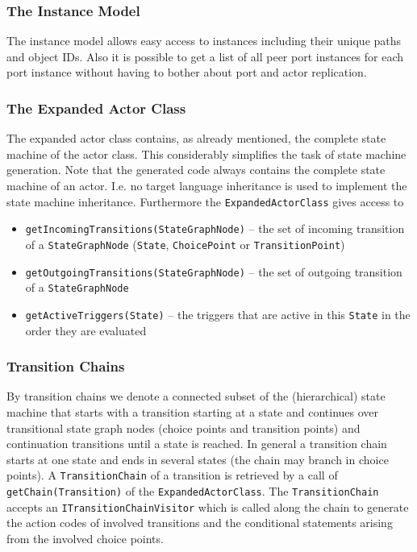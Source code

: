 \subsubsection{The Instance Model}

The instance model allows easy access to instances including their unique paths and object IDs. Also it is possible to get a list of all peer port instances for each port instance without having to bother about port and actor replication.

\subsubsection{The Expanded Actor Class}

The expanded actor class contains, as already mentioned, the complete state machine of the actor class. This considerably simplifies the task of state machine generation. Note that the generated code always contains the complete state machine of an actor. I.e. no target language inheritance is used to implement the state machine inheritance.
Furthermore the \texttt{ExpandedActorClass} gives access to
\begin{itemize}
\item \texttt{getIncomingTransitions(StateGraphNode)} -- the set of incoming transition of a \texttt{StateGraphNode} (\texttt{State}, \texttt{ChoicePoint} or \texttt{TransitionPoint})
\item \texttt{getOutgoingTransitions(StateGraphNode)} -- the set of outgoing transition of a \texttt{StateGraphNode}
\item \texttt{getActiveTriggers(State)} -- the triggers that are active in this \texttt{State} in the order they are evaluated
\end{itemize}

\subsubsection{Transition Chains}

By transition chains we denote a connected subset of the (hierarchical) state machine that starts with a transition starting at a state and continues over transitional state graph nodes (choice points and transition points) and continuation transitions until a state is reached. In general a transition chain starts at one state and ends in several states (the chain may branch in choice points).
A \texttt{TransitionChain} of a transition is retrieved by a call of \texttt{getChain(Transition)} of the \texttt{ExpandedActorClass}.
The \texttt{TransitionChain} accepts an \texttt{ITransitionChainVisitor} which is called along the chain to generate the action codes of involved transitions and the conditional statements arising from the involved choice points. 

